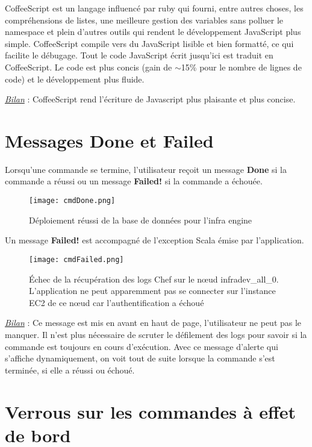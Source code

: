 CoffeeScript est un langage influencé par ruby qui fourni, entre autres choses,
les compréhensions de listes, une meilleure gestion des variables sans polluer
le namespace et plein d'autres outils qui rendent le développement JavaScript
plus simple. CoffeeScript compile vers du JavaScript lisible et bien formatté,
ce qui facilite le débugage.
Tout le code JavaScript écrit jusqu'ici est traduit en CoffeeScript.
Le code est plus concis (gain de $\sim$15\% pour le nombre de lignes de code) et le
développement plus fluide.

\underline{\textit{Bilan}} : CoffeeScript rend l'écriture de Javascript plus
plaisante et plus concise.

\section{Messages Done et Failed}

Lorsqu'une commande se termine, l'utilisateur reçoit un message \textbf{Done} si la
commande a réussi ou un message \textbf{Failed!} si la commande a échouée.

\begin{figure}[H]
  \texttt{[image: cmdDone.png]}
  \caption{Déploiement réussi de la base de données pour l'infra engine}
\end{figure}

Un message \textbf{Failed!} est accompagné de l'exception Scala émise par
l'application.

\begin{figure}[H]
  \texttt{[image: cmdFailed.png]}
  \caption{Échec de la récupération des logs Chef sur le nœud infradev\_all\_0.\\
    L'application ne peut apparemment pas se connecter sur l'instance EC2 de
    ce nœud car l'authentification a échoué}
\end{figure}

\underline{\textit{Bilan}} : Ce message est mis en avant en haut de page,
l'utilisateur ne peut pas le manquer.
Il n'est plus nécessaire de scruter le défilement des logs pour savoir si la
commande est toujours en cours d'exécution. Avec ce message d'alerte qui
s'affiche dynamiquement, on voit tout de suite lorsque la commande s'est
terminée, si elle a réussi ou échoué.

\section{Verrous sur les commandes à effet de bord}

